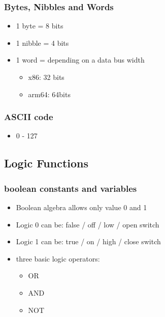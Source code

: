 \documentclass[11pt]{article}
\begin{document}
\subsubsection{Bytes, Nibbles and Words}
\label{sec:orgf69edf4}
\begin{itemize}
\item 1 byte = 8 bits
\item 1 nibble = 4 bits
\item 1 word = depending on a data bus width
\begin{itemize}
\item x86: 32 bits
\item arm64: 64bits
\end{itemize}
\end{itemize}
\subsubsection{ASCII code}
\label{sec:org9e5d467}
\begin{itemize}
\item 0 - 127
\end{itemize}
\subsection{Logic Functions}
\label{sec:org9d88606}
\subsubsection{boolean constants and variables}
\label{sec:org316d2f1}
\begin{itemize}
\item Boolean algebra allows only value 0 and 1
\item Logic 0 can be: false / off / low / open switch
\item Logic 1 can be: true / on / high / close switch
\item three basic logic operators:
\begin{itemize}
\item OR
\item AND
\item NOT
\end{itemize}
\end{itemize}
\end{document}
